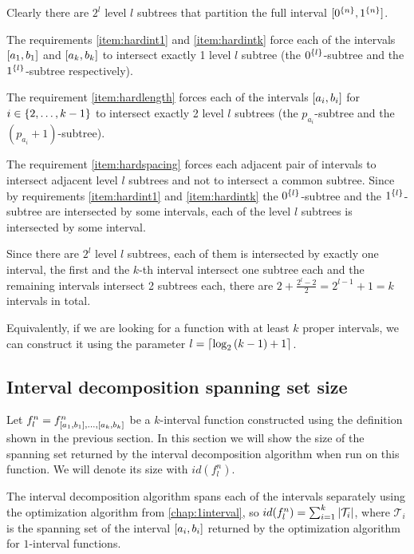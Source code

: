 Clearly there are $2^l$ level $l$ subtrees
that partition the full interval
$[0^{\{n\}}, 1^{\{n\}}]$.

The requirements
\ref{item:hardint1} and \ref{item:hardintk}
force each of the intervals
$[a_1, b_1]$ and $[a_k, b_k]$
to intersect exactly 1 level $l$ subtree
(the $0^{\{l\}}$-subtree
and the $1^{\{l\}}$-subtree respectively).

The requirement \ref{item:hardlength}
forces each of the intervals
$[a_i, b_i]$ for $i \in \{2, \ldots, k-1\}$
to intersect exactly 2 level $l$ subtrees
(the $p_{a_i}$-subtree and the $(p_{a_i}+1)$-subtree).

The requirement \ref{item:hardspacing}
forces each adjacent pair of intervals
to intersect adjacent level $l$ subtrees
and not to intersect a common subtree.
Since by requirements
\ref{item:hardint1} and \ref{item:hardintk}
the $0^{\{l\}}$-subtree
and the $1^{\{l\}}$-subtree
are intersected by some intervals,
each of the level $l$ subtrees is intersected
by some interval.

Since there are $2^l$ level $l$ subtrees,
each of them is intersected by exactly one interval,
the first and the $k$-th interval intersect
one subtree each
and the remaining intervals intersect 2 subtrees each,
there are $2 + \frac{2^l - 2}{2} = 2^{l-1} + 1 = k$
intervals in total.

Equivalently,
if we are looking for a  function
with at least $k$ proper intervals,
we can construct it using the parameter
$l = \lceil\log_2{(k-1)} + 1\rceil$.

\subsection{Interval decomposition spanning set size}

Let $f_l^n =
f^n_{[a_1, b_1], \ldots, [a_k, b_k]}$
be a $k$-interval function
constructed using the definition
shown in the previous section.
In this section we will show the size of the spanning set
returned by the interval decomposition algorithm
when run on this function.
We will denote its size with $id(f_l^n)$.

The interval decomposition algorithm spans
each of the intervals separately
using the optimization algorithm
from \autoref{chap:1interval},
so $id(f_l^n) = \sum_{i=1}^k{\lvert\mathcal{T}_i\rvert}$,
where $\mathcal{T}_i$ is the spanning set
of the interval $[a_i, b_i]$
returned by the optimization algorithm
for $1$-interval functions.

